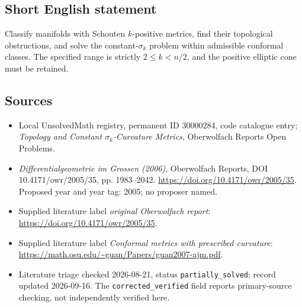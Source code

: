 \documentclass[11pt]{article}
\begin{document}
\subsection{Short English statement}
Classify manifolds with Schouten \(k\)-positive metrics, find their topological obstructions, and solve the constant-\(\sigma_k\) problem within admissible conformal classes. The specified range is strictly \(2\le k<n/2\), and the positive elliptic cone must be retained.
\subsection{Sources}
\begin{itemize}\item Local UnsolvedMath registry, permanent ID 30000284, code catalogue entry; \emph{Topology and Constant \(\sigma_k\)-Curvature Metrics}, Oberwolfach Reports Open Problems.\item \emph{Differentialgeometrie im Grossen (2006)}, Oberwolfach Reports, DOI 10.4171/owr/2005/35, pp. 1983--2042. \url{https://doi.org/10.4171/owr/2005/35}. Proposed year and year tag: 2005; no proposer named.\item Supplied literature label \emph{original Oberwolfach report}: \url{https://doi.org/10.4171/owr/2005/35}.\item Supplied literature label \emph{Conformal metrics with prescribed curvature}: \url{https://math.osu.edu/~guan/Papers/guan2007-ajm.pdf}.\item Literature triage checked 2026-08-21, status \texttt{partially\_solved}; record updated 2026-09-16. The \texttt{corrected\_verified} field reports primary-source checking, not independently verified here.\end{itemize}
\end{document}
